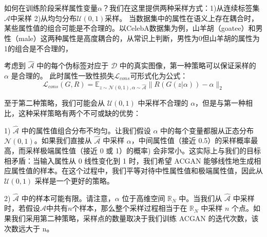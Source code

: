 如何在训练阶段采样属性变量$\alpha$？我们在这里提供两种采样方式：1)从连续标签集$\hat{\mathcal{A}}$中采样 2)从均匀分布$\mathcal{U}(0,1)$采样。
当数据集中的属性在语义上存在耦合时，某些属性值的组合可能是不合理的。以CelebA数据集为例，山羊胡（goatee）和男性（male）这两种属性是高度耦合的，从常识上判断，男性为0但山羊胡的属性为1的组合是不合理的，

考虑到 $\hat{\mathcal{A}}$ 中的每个伪标签对应于 $\mathcal{D}$ 中的真实图像，第一种策略可以保证采样的 $\alpha$ 是合理的。
此时属性一致性损失$\mathcal{L}_{cons}$可形式化为公式：
\begin{equation}
   \mathcal{L}_{cons}(G, R)  =  \mathbb{E}_{z \sim \mathcal{N}(0,1), \alpha \sim \hat{\mathcal{A}}}\|R(G(z|\alpha)) - \alpha\|_2
\end{equation}

至于第二种策略，我们可能会从 $\mathcal{U}(0,1)$ 中采样不合理的 $\alpha$，但是与第一种相比，这种采样策略有两个不可或缺的优势：

1) $\hat{\mathcal{A}}$ 中的属性值组合分布不均匀。让我们假设 $\alpha$ 中的每个变量都服从正态分布 $\mathcal{N}(0,1)$。如果我们直接从 $\hat{\mathcal{A}}$ 中采样 $\alpha$，中间属性值（接近 0.5）的采样概率最高，而采样极端属性值（接近 0 或 1）的概率) 会非常小。这实际上与我们的目标相矛盾：当输入属性从 0 线性变化到 1 时，我们希望 ACGAN 能够线性地生成相应属性值的样本。在这个过程中，我们平等对待中性属性值和极端属性值，因此从 $\mathcal{U}(0,1)$ 采样是一个更好的策略。

2) $\hat{\mathcal{A}}$ 中的样本可能有限。请注意，$\alpha$ 位于高维空间 $\mathbb{R}_N$ 中。当我们从 $\hat{\mathcal{A}}$ 中采样时，若假设${\mathcal{A}}$中共有$n$个样本，那么整个采样过程相当于在 $\mathbb{R}_N$ 中采样 $n$ 个点。如果我们采用第二种策略，采样点的数量取决于我们训练 ACGAN 的迭代次数，该次数远大于 n。

